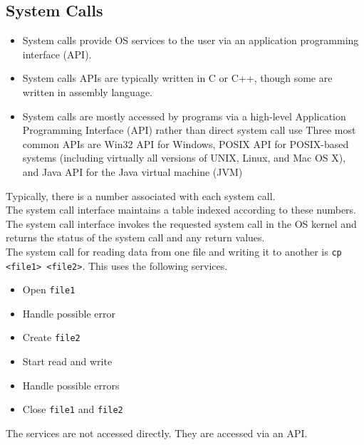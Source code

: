 \subsection{System Calls}
\begin{itemize}
  \item System calls provide OS services to the user via an application programming interface (API).
  \item System calls APIs are typically written in C or C++, though some are written in assembly language.
  \item System calls are mostly accessed by programs via a high-level Application Programming Interface (API) rather than direct system call use
Three most common APIs are Win32 API for Windows, POSIX API for POSIX-based systems (including virtually all versions of UNIX, Linux, and Mac OS X), and Java API for the Java virtual machine (JVM)
\end{itemize}
Typically, there is a number associated with each system call.\\ 
The system call interface maintains a table indexed according to these numbers.\\
The system call interface invokes the requested system call in the OS kernel and returns the status of the system call and any return values.\\
The system call for reading data from one file and writing it to another is \texttt{cp <file1> <file2>}.
This uses the following services.
\begin{itemize}
  \item Open \texttt{file1}
  \item Handle possible error
  \item Create \texttt{file2}
  \item Start read and write
  \item Handle possible errors
  \item Close \texttt{file1} and \texttt{file2}
\end{itemize}
The services are not accessed directly.
They are accessed via an API.

